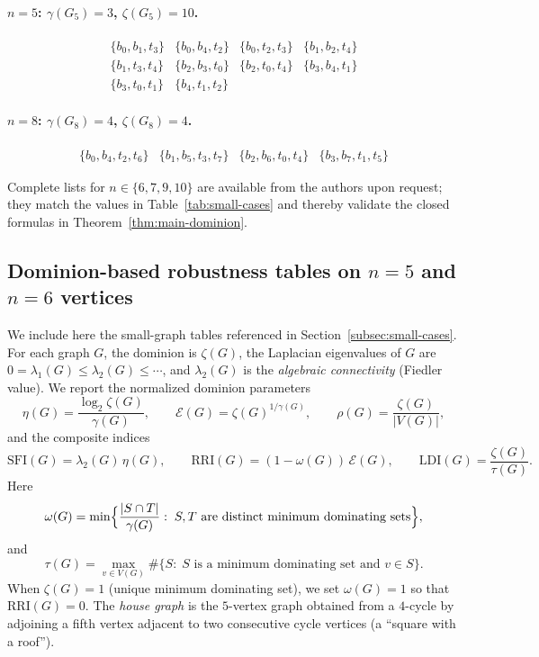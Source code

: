 \documentclass[11pt]{article}
\theoremstyle{plain}
\theoremstyle{definition}
\theoremstyle{remark}
\begin{document}
\paragraph{$n=5$: $\gamma(G_5)=3$, $\zeta(G_5)=10$.}
\[
\begin{array}{llll}
\{b_0,b_1,t_3\}&\{b_0,b_4,t_2\}&\{b_0,t_2,t_3\}&\{b_1,b_2,t_4\}\\
\{b_1,t_3,t_4\}&\{b_2,b_3,t_0\}&\{b_2,t_0,t_4\}&\{b_3,b_4,t_1\}\\
\{b_3,t_0,t_1\}&\{b_4,t_1,t_2\}&&
\end{array}
\]

\paragraph{$n=8$: $\gamma(G_8)=4$, $\zeta(G_8)=4$.}
\[
\begin{array}{llll}
\{b_0,b_4,t_2,t_6\}&\{b_1,b_5,t_3,t_7\}&\{b_2,b_6,t_0,t_4\}&\{b_3,b_7,t_1,t_5\}
\end{array}
\]

\medskip
\noindent
Complete lists for $n\in\{6,7,9,10\}$ are available from the authors upon request; they match the
values in Table~\ref{tab:small-cases} and thereby validate the closed formulas in
Theorem~\ref{thm:main-dominion}.

\subsection{Dominion-based robustness tables on $n=5$ and $n=6$ vertices}\label{app:robustness-tables}

We include here the small-graph tables referenced in Section~\ref{subsec:small-cases}.  For each graph
$G$, the dominion is $\zeta(G)$, the Laplacian eigenvalues of $G$ are
$0=\lambda_1(G)\le \lambda_2(G)\le \cdots$, and $\lambda_2(G)$ is the \emph{algebraic connectivity}
(Fiedler value).  We report the normalized dominion parameters
\[
\eta(G)=\frac{\log_2\zeta(G)}{\gamma(G)},\qquad
\mathcal{E}(G)=\zeta(G)^{1/\gamma(G)},\qquad
\rho(G)=\frac{\zeta(G)}{|V(G)|},
\]
and the composite indices
\[
\mathrm{SFI}(G)=\lambda_2(G)\,\eta(G),\qquad
\mathrm{RRI}(G)=(1-\omega(G))\,\mathcal{E}(G),\qquad
\mathrm{LDI}(G)=\frac{\zeta(G)}{\tau(G)}.
\]
Here
\[
\omega(G)=\min\Bigl\{\frac{|S\cap T|}{\gamma(G)}:\; S,T \text{ are distinct minimum dominating sets}\Bigr\},
\]
and
\[
\tau(G)=\max_{v\in V(G)}\#\{S:\; S \text{ is a minimum dominating set and } v\in S\}.
\]
When $\zeta(G)=1$ (unique minimum dominating set), we set $\omega(G)=1$ so that $\mathrm{RRI}(G)=0$.
The \emph{house graph} is the $5$-vertex graph obtained from a $4$-cycle by adjoining a fifth
vertex adjacent to two consecutive cycle vertices (a ``square with a roof'').
\end{document}
